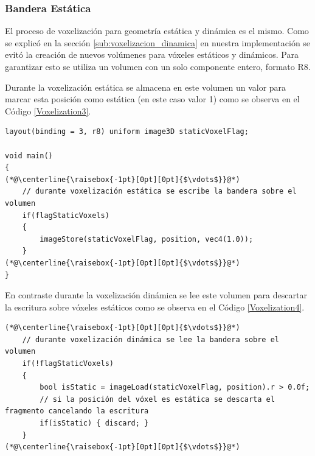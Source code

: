 \subsubsection{Bandera Estática}
El proceso de voxelización para geometría estática y dinámica es el mismo. Como se explicó en la sección \ref{sub:voxelizacion_dinamica} en nuestra implementación se evitó la creación de nuevos volúmenes para vóxeles estáticos y dinámicos. Para garantizar esto se utiliza un volumen con un solo componente entero, formato R8.

Durante la voxelización estática se almacena en este volumen un valor para marcar esta posición como estática (en este caso valor 1) como se observa en el Código \ref{Voxelization3}. 
\\
\begin{lstlisting}[caption={Escritura de la bandera estática durante voxelización de geometría estática}, label=Voxelization3]
layout(binding = 3, r8) uniform image3D staticVoxelFlag;

void main()
{
(*@\centerline{\raisebox{-1pt}[0pt][0pt]{$\vdots$}}@*)
    // durante voxelización estática se escribe la bandera sobre el volumen
    if(flagStaticVoxels)
    {
        imageStore(staticVoxelFlag, position, vec4(1.0));
    }
(*@\centerline{\raisebox{-1pt}[0pt][0pt]{$\vdots$}}@*)
}
\end{lstlisting}

En contraste durante la voxelización dinámica se lee este volumen para descartar la escritura sobre vóxeles estáticos como se observa en el Código \ref{Voxelization4}.
\\
\begin{lstlisting}[caption={Lectura de la bandera estática durante voxelización de geometría dinámica.}, label=Voxelization4]
(*@\centerline{\raisebox{-1pt}[0pt][0pt]{$\vdots$}}@*)
    // durante voxelización dinámica se lee la bandera sobre el volumen
    if(!flagStaticVoxels)
    {
        bool isStatic = imageLoad(staticVoxelFlag, position).r > 0.0f;
        // si la posición del vóxel es estática se descarta el fragmento cancelando la escritura
        if(isStatic) { discard; }
    }
(*@\centerline{\raisebox{-1pt}[0pt][0pt]{$\vdots$}}@*)
\end{lstlisting}


